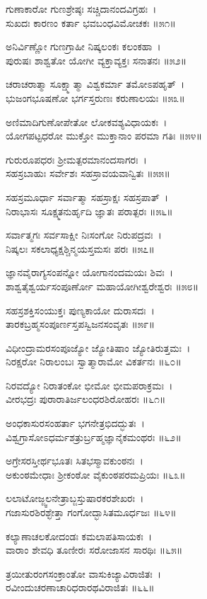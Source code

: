 	ಗುಣಾಕಾರೋ ಗುಣಶ್ರೇಷ್ಠಃ ಸಚ್ಚಿದಾನಂದವಿಗ್ರಹಃ~।\\
	ಸುಖದಃ ಕಾರಣಂ ಕರ್ತಾ ಭವಬಂಧವಿಮೋಚಕಃ ॥೫೧॥

ಅನಿರ್ವಿಣ್ಣೋ ಗುಣಗ್ರಾಹೀ ನಿಷ್ಕಲಂಕಃ ಕಲಂಕಹಾ~।\\
ಪುರುಷಃ ಶಾಶ್ವತೋ ಯೋಗೀ ವ್ಯಕ್ತಾವ್ಯಕ್ತಃ ಸನಾತನಃ ॥೫೨॥

	ಚರಾಚರಾತ್ಮಾ ಸೂಕ್ಷ್ಮಾತ್ಮಾ ವಿಶ್ವಕರ್ಮಾ ತಮೋಽಪಹೃತ್~।\\
	ಭುಜಂಗಭೂಷಣೋ ಭರ್ಗಸ್ತರುಣಃ ಕರುಣಾಲಯಃ ॥೫೩॥

ಅಣಿಮಾದಿಗುಣೋಪೇತೋ ಲೋಕವಶ್ಯವಿಧಾಯಕಃ~।\\
ಯೋಗಪಟ್ಟಧರೋ ಮುಕ್ತೋ ಮುಕ್ತಾನಾಂ ಪರಮಾ ಗತಿಃ ॥೫೪॥

	ಗುರುರೂಪಧರಃ ಶ್ರೀಮತ್ಪರಮಾನಂದಸಾಗರಃ~।\\
	ಸಹಸ್ರಬಾಹುಃ ಸರ್ವೇಶಃ ಸಹಸ್ರಾವಯವಾನ್ವಿತಃ ॥೫೫॥

ಸಹಸ್ರಮೂರ್ಧಾ ಸರ್ವಾತ್ಮಾ ಸಹಸ್ರಾಕ್ಷಃ ಸಹಸ್ರಪಾತ್~।\\
ನಿರಾಭಾಸಃ ಸೂಕ್ಷ್ಮತನುರ್ಹೃದಿ ಜ್ಞಾತಃ ಪರಾತ್ಪರಃ ॥೫೬॥

	ಸರ್ವಾತ್ಮಗಃ ಸರ್ವಸಾಕ್ಷೀ ನಿಃಸಂಗೋ ನಿರುಪದ್ರವಃ~।\\
	ನಿಷ್ಕಲಃ ಸಕಲಾಧ್ಯಕ್ಷಶ್ಚಿನ್ಮಯಸ್ತಮಸಃ ಪರಃ ॥೫೭॥

ಜ್ಞಾನವೈರಾಗ್ಯಸಂಪನ್ನೋ ಯೋಗಾನಂದಮಯಃ ಶಿವಃ~।\\
ಶಾಶ್ವತೈಶ್ವರ್ಯಸಂಪೂರ್ಣೋ ಮಹಾಯೋಗೀಶ್ವರೇಶ್ವರಃ ॥೫೮॥

	ಸಹಸ್ರಶಕ್ತಿಸಂಯುಕ್ತಃ ಪುಣ್ಯಕಾಯೋ ದುರಾಸದಃ~।\\
	ತಾರಕಬ್ರಹ್ಮಸಂಪೂರ್ಣಸ್ತಪಸ್ವಿಜನಸಂವೃತಃ ॥೫೯॥

ವಿಧೀಂದ್ರಾಮರಸಂಪೂಜ್ಯೋ ಜ್ಯೋತಿಷಾಂ ಜ್ಯೋತಿರುತ್ತಮಃ~।\\
ನಿರಕ್ಷರೋ ನಿರಾಲಂಬಃ ಸ್ವಾತ್ಮಾರಾಮೋ ವಿಕರ್ತನಃ ॥೬೦॥

	ನಿರವದ್ಯೋ ನಿರಾತಂಕೋ ಭೀಮೋ ಭೀಮಪರಾಕ್ರಮಃ~।\\
	ವೀರಭದ್ರಃ ಪುರಾರಾತಿರ್ಜಲಂಧರಶಿರೋಹರಃ ॥೬೧॥

ಅಂಧಕಾಸುರಸಂಹರ್ತಾ ಭಗನೇತ್ರಭಿದದ್ಭುತಃ~।\\
ವಿಶ್ವಗ್ರಾಸೋಽಧರ್ಮಶತ್ರುರ್ಬ್ರಹ್ಮಜ್ಞಾನೈಕಮಂಥರಃ ॥೬೨॥

	ಅಗ್ರೇಸರಸ್ತೀರ್ಥಭೂತಃ ಸಿತಭಸ್ಮಾವಕುಂಠನಃ~।\\
	ಅಕುಂಠಮೇಧಾಃ ಶ್ರೀಕಂಠೋ ವೈಕುಂಠಪರಮಪ್ರಿಯಃ ॥೬೩॥

ಲಲಾಟೋಜ್ಜ್ವಲನೇತ್ರಾಬ್ಜಸ್ತುಷಾರಕರಶೇಖರಃ~।\\
ಗಜಾಸುರಶಿರಶ್ಛೇತ್ತಾ ಗಂಗೋದ್ಭಾಸಿತಮೂರ್ಧಜಃ ॥೬೪॥

	ಕಲ್ಯಾಣಾಚಲಕೋದಂಡಃ ಕಮಲಾಪತಿಸಾಯಕಃ~।\\
	ವಾರಾಂ ಶೇವಧಿ ತೂಣೀರಃ ಸರೋಜಾಸನ ಸಾರಥಿಃ ॥೬೫॥

ತ್ರಯೀತುರಂಗಸಂಕ್ರಾಂತೋ ವಾಸುಕಿಜ್ಯಾವಿರಾಜಿತಃ~।\\
ರವೀಂದುಚರಣಾಚಾರಿಧರಾರಥವಿರಾಜಿತಃ ॥೬೬॥

